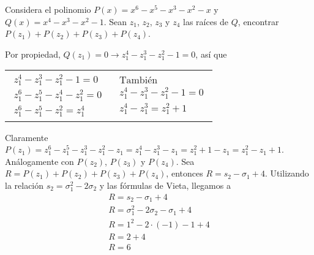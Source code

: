 \begin{section-problem}
    Considera el polinomio $P(x) = x^6 - x^5 - x^3 - x^2 - x$ y $Q(x) = x^4 - x^3 - x^2 - 1$.
    Sean $z_1$, $z_2$, $z_3$ y $z_4$ las raíces de $Q$, encontrar $P(z_1) + P(z_2) + P(z_3) + P(z_4)$.
\end{section-problem}

\begin{solution}
    Por propiedad, $Q(z_1) = 0 \rightarrow z_1^4 - z_1^3 - z_1^2 - 1 = 0$, así que
    \vspace{-10mm}
    \begin{table}[H]
        \centering
        \begin{tabular}{p{5cm} p{5cm}}
            \begin{gather*}
                z_1^4 - z_1^3 - z_1^2 - 1 = 0\\
                z_1^6 - z_1^5 - z_1^4 - z_1^2 = 0\\
                \boxed{z_1^6 - z_1^5 - z_1^2 = z_1^4}
            \end{gather*}
            &
            \begin{gather*}
                \mbox{También}\\
                z_1^4 - z_1^3 - z_1^2 - 1 = 0\\
                \boxed{z_1^4 - z_1^3 = z_1^2 + 1}
            \end{gather*}
        \end{tabular}
    \end{table}
    \vspace{-10mm}

    Claramente $P(z_1) = z_1^6 - z_1^5 - z_1^3 - z_1^2 - z_1 = z_1^4 - z_1^3 - z_1 = z_1^2 + 1 - z_1 = \boxed{z_1^2 - z_1 + 1}$.
    Análogamente con $P(z_2)$, $P(z_3)$ y $P(z_4)$.
    Sea $R = P(z_1) + P(z_2) + P(z_3) + P(z_4)$, entonces $R = s_2 - \sigma_1 + 4$.
    Utilizando la relación $s_2 = \sigma_1^2 - 2\sigma_2$ y las fórmulas de Vieta, llegamos a
    \begin{gather*}
        R = s_2 - \sigma_1 + 4\\
        R = \sigma_1^2 - 2\sigma_2 - \sigma_1 + 4\\
        R = 1^2 - 2\cdot(-1) - 1 + 4\\
        R = 2 + 4\\
        \boxed{R = 6}
    \end{gather*}

\end{solution}
